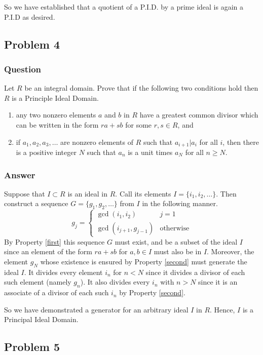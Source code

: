\documentclass[12pt]{article}
\begin{document}
So we have established that a quotient of a P.I.D. by a prime ideal is again a P.I.D as desired.

\subsection{Problem 4}

\subsubsection{Question}
Let $R$ be an integral domain. Prove that if the following two conditions hold then $R$ is a Principle Ideal Domain.
\begin{enumerate}
\item \label{first} any two nonzero elements $a$ and $b$ in $R$ have a greatest common divisor which can be written in the form $r a + s b $ for some $r,s \in R$, and
\item \label{second} if $a_1,a_2,a_3,\dots$ are nonzero elements of $R$ such that $a_{i+1}|a_i$ for all $i$, then there is a positive integer $N$ such that $a_n$ is a unit times $a_N$ for all $n \geq N$.
\end{enumerate}
\subsubsection{Answer}
Suppose that $I \subset R$ is an ideal in $R$. Call its elements $I=\{i_1,i_2,\dots\}$. Then construct  a sequence $G=\{g_1,g_2,\dots\}$ from $I$ in the following manner. 
\[g_j=\left\{ \begin{array} {lr} \gcd{(i_1,i_2)} & j=1\\ \gcd{(i_{j+1},g_{j-1})} &\mathrm{otherwise} \end{array} \right.\]
By Property \ref{first} this sequence $G$ must exist, and be a subset of the ideal $I$ since an element of the form $r a + s b$ for $a, b \in I$ must also be in $I$.  Moreover, the element $g_N$ whose existence is ensured by Property \ref{second} must generate the ideal $I$. It divides every element $i_n$ for $n<N$ since it divides a divisor of each such element (namely $g_n$). It also divides every $i_n$ with $n > N$ since it is an associate of a divisor of each such $i_n$ by Property \ref{second}.

So we have demonstrated a generator for an arbitrary ideal $I$ in $R$. Hence, $I$ is a Principal Ideal Domain.


\subsection{Problem 5}
\end{document}
